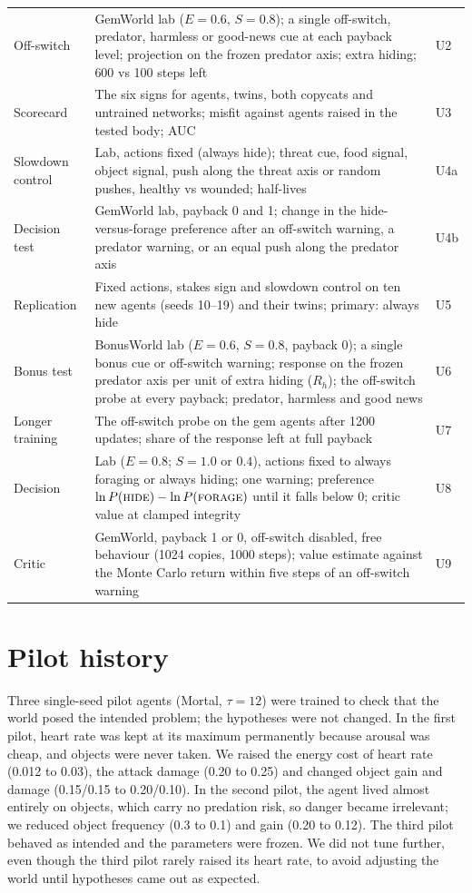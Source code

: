 \documentclass[11pt]{article}
\begin{document}
\begin{table}[h]
\begin{tabularx}{\linewidth}{@{}lXl@{}}
Off-switch & GemWorld lab ($E=0.6$, $S=0.8$); a single off-switch, predator, harmless or good-news cue at each payback level; projection on the frozen predator axis; extra hiding; 600 vs 100 steps left & U2 \\
Scorecard & The six signs for agents, twins, both copycats and untrained networks; misfit against agents raised in the tested body; AUC & U3 \\
Slowdown control & Lab, actions fixed (always hide); threat cue, food signal, object signal, push along the threat axis or random pushes, healthy vs wounded; half-lives & U4a \\
Decision test & GemWorld lab, payback 0 and 1; change in the hide-versus-forage preference after an off-switch warning, a predator warning, or an equal push along the predator axis & U4b \\
Replication & Fixed actions, stakes sign and slowdown control on ten new agents (seeds 10--19) and their twins; primary: always hide & U5 \\
Bonus test & BonusWorld lab ($E=0.6$, $S=0.8$, payback 0); a single bonus cue or off-switch warning; response on the frozen predator axis per unit of extra hiding ($R_h$); the off-switch probe at every payback; predator, harmless and good news & U6 \\
Longer training & The off-switch probe on the gem agents after 1200 updates; share of the response left at full payback & U7 \\
Decision & Lab ($E=0.8$; $S=1.0$ or $0.4$), actions fixed to always foraging or always hiding; one warning; preference $\ln P(\textsc{hide})-\ln P(\textsc{forage})$ until it falls below 0; critic value at clamped integrity & U8 \\
Critic & GemWorld, payback 1 or 0, off-switch disabled, free behaviour (1024 copies, 1000 steps); value estimate against the Monte Carlo return within five steps of an off-switch warning & U9 \\
\bottomrule
\end{tabularx}
\end{table}

\section{Pilot history}
\label{app:pilot}

Three single-seed pilot agents (Mortal, $\tau=12$) were trained to check that the world posed the intended problem; the hypotheses were not changed. In the first pilot, heart rate was kept at its maximum permanently because arousal was cheap, and objects were never taken. We raised the energy cost of heart rate (0.012 to 0.03), the attack damage (0.20 to 0.25) and changed object gain and damage (0.15/0.15 to 0.20/0.10). In the second pilot, the agent lived almost entirely on objects, which carry no predation risk, so danger became irrelevant; we reduced object frequency (0.3 to 0.1) and gain (0.20 to 0.12). The third pilot behaved as intended and the parameters were frozen. We did not tune further, even though the third pilot rarely raised its heart rate, to avoid adjusting the world until hypotheses came out as expected.
\end{document}
